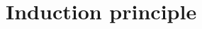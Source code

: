 \documentclass[thesis.tex]{subfiles}
\begin{document}
\section{Induction principle}


\end{document}
